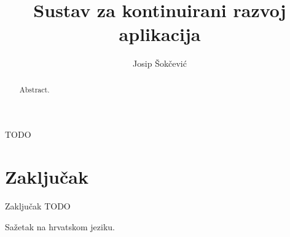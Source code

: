 \documentclass[times, utf8, numeric, diplomski]{ferit}
\begin{document}
\title{Sustav za kontinuirani razvoj aplikacija}

\author{Josip Šokčević}
\maketitle


\zahvala{}
TODO

\tableofcontents









\chapter{Zaključak}
Zaključak TODO




\begin{sazetak}
Sažetak na hrvatskom jeziku.
\end{sazetak}

\begin{abstract}
Abstract.

\end{abstract}
\end{document}
